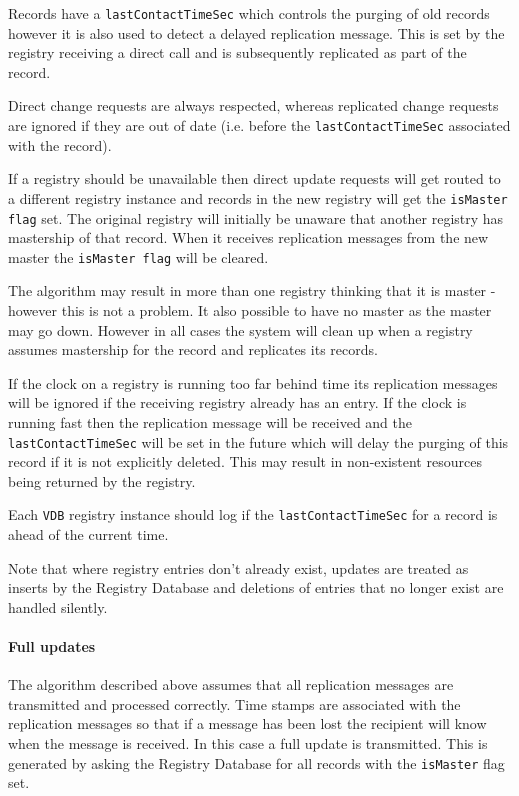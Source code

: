 Records have a \texttt{lastContactTimeSec} which controls the purging
of old records however it is also used to detect a delayed replication
message. This is set by the registry receiving a direct call and is
subsequently replicated as part of the record.

Direct change requests are always respected, whereas replicated change
requests are ignored if they are out of date (i.e. before the
\texttt{lastContactTimeSec} associated with the record). 

If a registry should be unavailable then direct update requests will
get routed to a different registry instance and records in the new
registry will get the \texttt{isMaster flag} set. The original
registry will initially be unaware that another registry has
mastership of that record. When it receives replication messages from
the new master the \texttt{isMaster flag} will  be cleared.

The algorithm may result in more than one registry thinking that it is
master - however this is not a problem. It also possible to have no
master as the master may go down. However in all cases the system will
clean up when a registry assumes mastership for the record and
replicates its records.

If the clock on a registry is running too far behind time its
replication messages will be ignored if the receiving registry already
has an entry. If the clock is running fast then the replication
message will be received and the \texttt{lastContactTimeSec} will be
set in the future which will delay the purging of this record if it is
not explicitly deleted. This may result in non-existent resources
being returned by the registry.

Each \texttt{VDB} registry instance should log if the
\texttt{lastContactTimeSec} for a record is ahead of the current
time.

Note that where registry entries don't already exist, updates are
treated as inserts by the Registry Database and deletions of entries
that no longer exist are handled silently.

\paragraph{Full updates}

The algorithm described above assumes that all replication messages
are transmitted and processed correctly. Time stamps are associated
with the replication messages so that if a message has been lost the
recipient will know when the message is received. In this case a full
update is transmitted. This is generated by asking the Registry
Database for all records with the \texttt{isMaster} flag set.

